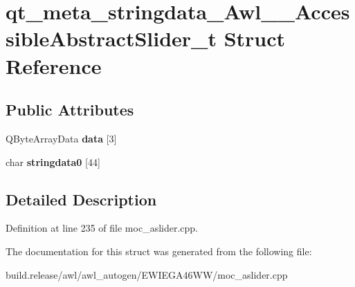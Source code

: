 \hypertarget{structqt__meta__stringdata___awl_____accessible_abstract_slider__t}{}\section{qt\+\_\+meta\+\_\+stringdata\+\_\+\+Awl\+\_\+\+\_\+\+Accessible\+Abstract\+Slider\+\_\+t Struct Reference}
\label{structqt__meta__stringdata___awl_____accessible_abstract_slider__t}
\subsection*{Public Attributes}
\begin{DoxyCompactItemize}
\item 
\mbox{\label{structqt__meta__stringdata___awl_____accessible_abstract_slider__t_a05f7a3dc04c4d264d114ab1d89c251e5}} 
Q\+Byte\+Array\+Data {\bfseries data} \mbox{[}3\mbox{]}
\item 
\mbox{\label{structqt__meta__stringdata___awl_____accessible_abstract_slider__t_aa1e42bdecfd2de1b891eae76e2a44d1c}} 
char {\bfseries stringdata0} \mbox{[}44\mbox{]}
\end{DoxyCompactItemize}


\subsection{Detailed Description}


Definition at line 235 of file moc\+\_\+aslider.\+cpp.



The documentation for this struct was generated from the following file\+:\begin{DoxyCompactItemize}
\item 
build.\+release/awl/awl\+\_\+autogen/\+E\+W\+I\+E\+G\+A46\+W\+W/moc\+\_\+aslider.\+cpp\end{DoxyCompactItemize}
